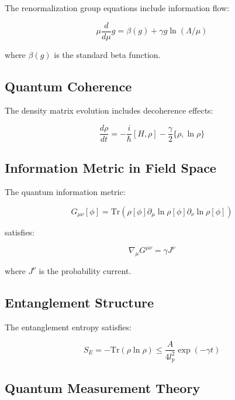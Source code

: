 \documentclass[12pt]{article}
\theoremstyle{plain}
\theoremstyle{definition}
\theoremstyle{remark}
\begin{document}
The renormalization group equations include information flow:

\begin{equation}
\mu\frac{d}{d\mu}g = \beta(g) + \gamma g\ln(\Lambda/\mu)
\end{equation}

where $\beta(g)$ is the standard beta function.

\subsection{Quantum Coherence}

The density matrix evolution includes decoherence effects:

\begin{equation}
\frac{d\rho}{dt} = -\frac{i}{\hbar}[H,\rho] - \frac{\gamma}{2}\{\rho,\ln\rho\}
\end{equation}

\subsection{Information Metric in Field Space}

The quantum information metric:

\begin{equation}
G_{\mu\nu}[\phi] = \text{Tr}\left(\rho[\phi]\partial_{\mu}\ln\rho[\phi]\partial_{\nu}\ln\rho[\phi]\right)
\end{equation}

satisfies:

\begin{equation}
\nabla_{\mu}G^{\mu\nu} = \gamma J^{\nu}
\end{equation}

where $J^{\nu}$ is the probability current.

\subsection{Entanglement Structure}

The entanglement entropy satisfies:

\begin{equation}
S_E = -\text{Tr}(\rho\ln\rho) \leq \frac{A}{4l_p^2}\exp(-\gamma t)
\end{equation}

\subsection{Quantum Measurement Theory}
\end{document}
